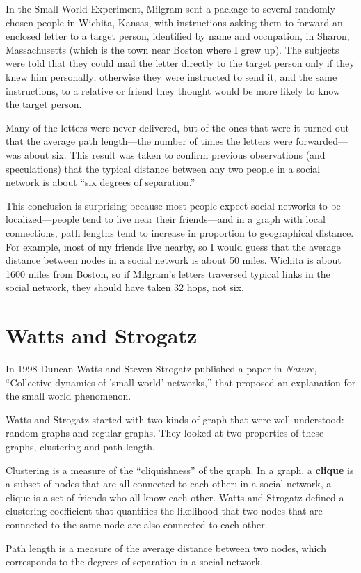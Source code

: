 \documentclass[10pt]{book}
\begin{document}
In the Small World Experiment, Milgram sent a package to several
randomly-chosen people in Wichita, Kansas, with instructions asking
them to forward an enclosed letter to a target person, identified by
name and occupation, in Sharon, Massachusetts (which is the town near
Boston where I grew up).  The subjects were told that they could mail
the letter directly to the target person only if they knew him
personally; otherwise they were instructed to send it, and the same
instructions, to a relative or friend they thought would be more
likely to know the target person.

Many of the letters were never delivered, but of the ones that
were it turned out that the average path length---the number of
times the letters were forwarded---was about six.  This result
was taken to confirm previous observations (and speculations) that
the typical distance between any two people in a social network
is about ``six degrees of separation.''

This conclusion is surprising because most people expect social
networks to be localized---people tend to live near their
friends---and in a graph with local connections, path lengths tend to
increase in proportion to geographical distance.  For example, most of
my friends live nearby, so I would guess that the average distance
between nodes in a social network is about 50 miles.  Wichita is about
1600 miles from Boston, so if Milgram's letters traversed typical
links in the social network, they should have taken 32 hops, not six.


\section{Watts and Strogatz}

In 1998 Duncan Watts and Steven Strogatz published a paper
in {\em Nature}, ``Collective dynamics of 'small-world' networks,''
that proposed an explanation for the small world phenomenon.

Watts and Strogatz started with two kinds of graph that were well
understood: random graphs and regular graphs.  They looked at two
properties of these graphs, clustering and path length.

\begin{description}

\item Clustering is a measure of the ``cliquishness'' of the graph.
In a graph, a {\bf clique} is a subset of nodes that are
all connected to each other; in a social network, a clique is
a set of friends who all know each other.  Watts and Strogatz
defined a clustering coefficient that quantifies the likelihood
that two nodes that are connected to the same node are also
connected to each other.

\item Path length is a measure of the average distance between
two nodes, which corresponds to the degrees of separation in
a social network.

\end{description}
\end{document}
